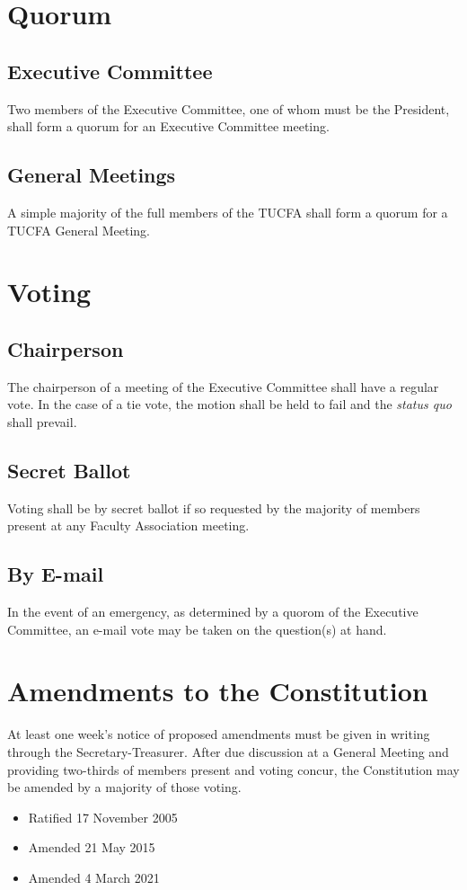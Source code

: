 \documentclass[12pt]{article}
\begin{document}
\section{Quorum}

\subsection{Executive Committee}
Two members of the Executive Committee, one of whom must be the President, shall form a quorum for an Executive Committee meeting.

\subsection{General Meetings}
A simple majority of the full members of the TUCFA shall form a quorum for a TUCFA General Meeting.

\section{Voting}

\subsection{Chairperson}
The chairperson of a meeting of the Executive Committee shall have a regular vote. In the case of a tie vote, the motion shall be held to fail and the \emph{status quo} shall prevail.

\subsection{Secret Ballot}
Voting shall be by secret ballot if so requested by the majority of members present at any Faculty Association meeting.

\subsection{By E-mail}
In the event of an emergency, as determined by a quorom of the Executive Committee, an e-mail vote may be taken on the question(s) at hand.

\section{Amendments to the Constitution}

At least one week's notice of proposed amendments must be given in writing through the Secretary-Treasurer. After due discussion at a General Meeting and providing two-thirds of members present and voting concur, the Constitution may be amended by a majority of those voting.

\begin{itemize}
\item
Ratified 17 November 2005
\item
Amended 21 May 2015
\item
Amended 4 March 2021
\end{itemize}
\end{document}
